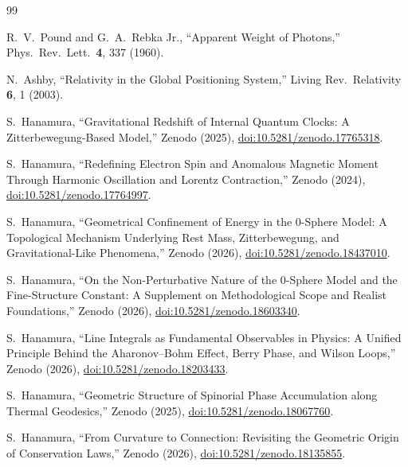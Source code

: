 \documentclass[%
 reprint,
 amsmath,amssymb,
 aps,
 prb,
]{revtex4-2}
\numberwithin{equation}{section}
\begin{document}
\begin{thebibliography}{99}

R.~V.~Pound and G.~A.~Rebka Jr.,
``Apparent Weight of Photons,''
Phys.\ Rev.\ Lett.\ \textbf{4}, 337 (1960).

N.~Ashby,
``Relativity in the Global Positioning System,''
Living Rev.\ Relativity \textbf{6}, 1 (2003).

S.~Hanamura,
``Gravitational Redshift of Internal Quantum Clocks: A Zitterbewegung-Based Model,''
Zenodo (2025), \href{https://doi.org/10.5281/zenodo.17765318}{doi:10.5281/zenodo.17765318}.

S.~Hanamura,
``Redefining Electron Spin and Anomalous Magnetic Moment Through Harmonic Oscillation and Lorentz Contraction,''
Zenodo (2024), \href{https://doi.org/10.5281/zenodo.17764997}{doi:10.5281/zenodo.17764997}.

S.~Hanamura,
``Geometrical Confinement of Energy in the 0-Sphere Model: A Topological Mechanism Underlying Rest Mass, Zitterbewegung, and Gravitational-Like Phenomena,''
Zenodo (2026), \href{https://doi.org/10.5281/zenodo.18437010}{doi:10.5281/zenodo.18437010}.

S.~Hanamura,
``On the Non-Perturbative Nature of the 0-Sphere Model and the Fine-Structure Constant: A Supplement on Methodological Scope and Realist Foundations,''
Zenodo (2026), \href{https://doi.org/10.5281/zenodo.18603340}{doi:10.5281/zenodo.18603340}.

S.~Hanamura,
``Line Integrals as Fundamental Observables in Physics: A Unified Principle Behind the Aharonov--Bohm Effect, Berry Phase, and Wilson Loops,''
Zenodo (2026), \href{https://doi.org/10.5281/zenodo.18203433}{doi:10.5281/zenodo.18203433}.

S.~Hanamura,
``Geometric Structure of Spinorial Phase Accumulation along Thermal Geodesics,''
Zenodo (2025), \href{https://doi.org/10.5281/zenodo.18067760}{doi:10.5281/zenodo.18067760}.

S.~Hanamura,
``From Curvature to Connection: Revisiting the Geometric Origin of Conservation Laws,''
Zenodo (2026), \href{https://doi.org/10.5281/zenodo.18135855}{doi:10.5281/zenodo.18135855}.


\end{thebibliography}
\end{document}
